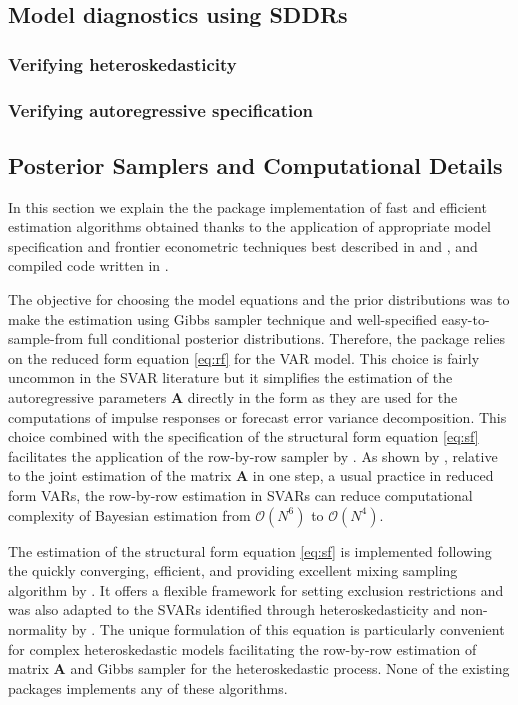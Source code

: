 \documentclass[
  nojss]{jss}
\begin{document}
\subsection{Model diagnostics using SDDRs}

\cite{Verdinelli1995}

\subsubsection{Verifying heteroskedasticity}

\subsubsection{Verifying autoregressive specification}

\subsection{Posterior Samplers and Computational Details}\label{sec:posterior}

In this section we explain the the  package implementation
of fast and efficient estimation algorithms obtained thanks to the
application of appropriate model specification and frontier econometric
techniques best described in \cite{LSUW2024} and \cite{Wozniak2015}, and
compiled code written in .

The objective for choosing the model equations and the prior
distributions was to make the estimation using Gibbs sampler technique
\citep[see e.g.][]{CasellaGeorge1992} and well-specified
easy-to-sample-from full conditional posterior distributions. Therefore,
the package relies on the reduced form equation \eqref{eq:rf} for the
VAR model. This choice is fairly uncommon in the SVAR literature but it
simplifies the estimation of the autoregressive parameters
\(\mathbf{A}\) directly in the form as they are used for the
computations of impulse responses or forecast error variance
decomposition. This choice combined with the specification of the
structural form equation \eqref{eq:sf} facilitates the application of
the row-by-row sampler by \cite{chankoopyu2024}. As shown by
\cite{carriero_large_2019}, relative to the joint estimation of the
matrix \(\mathbf{A}\) in one step, a usual practice in reduced form
VARs, the row-by-row estimation in SVARs can reduce computational
complexity of Bayesian estimation from \(\mathcal{O}(N^6)\) to
\(\mathcal{O}(N^4)\).

The estimation of the structural form equation \eqref{eq:sf} is
implemented following the quickly converging, efficient, and providing
excellent mixing sampling algorithm by \cite{WaggonerZha2003}. It offers
a flexible framework for setting exclusion restrictions and was also
adapted to the SVARs identified through heteroskedasticity and
non-normality by \cite{Wozniak2015}. The unique formulation of this
equation is particularly convenient for complex heteroskedastic models
facilitating the row-by-row estimation of matrix \(\mathbf{A}\) and
Gibbs sampler for the heteroskedastic process. None of the existing
 packages implements any of these algorithms.
\end{document}
